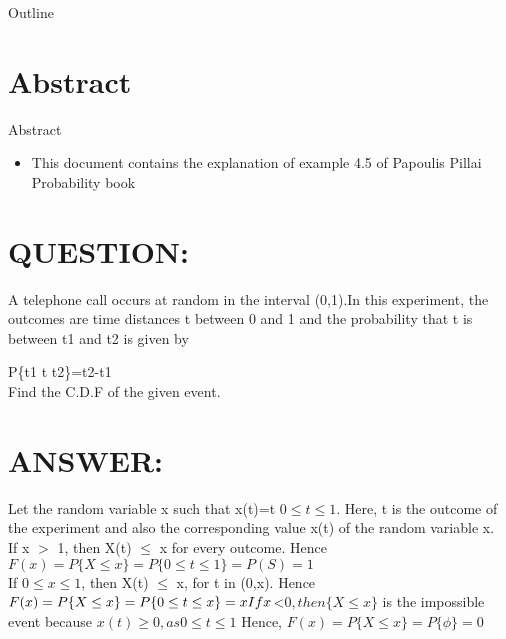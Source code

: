 \documentclass{beamer}
\title{\typedef{ASSIGNMENT 5}}
\author{MUSKAN JAISWAL -cs21btech11037}
\date{May 2022}
\begin{document}
\begin{frame}
		\titlepage
	\end{frame}

\begin{frame}{Outline}
  \tableofcontents
\end{frame}

\section{Abstract}
	\begin{frame}{Abstract}
		\begin{itemize}
			\item 	This document contains the explanation of example 4.5 of Papoulis Pillai Probability book
		\end{itemize}
	\end{frame}


\maketitle

\section{QUESTION:}
\begin{frame}{}
\begin{block}{}
A telephone call occurs at random in the interval (0,1).In this experiment, the outcomes are time distances t between 0 and 1 and the probability that t is between t1 and t2 is given by \bigskip

P\{t1 \le t \le t2\}=t2-t1 \\
Find the C.D.F of the given event.
\end{block}
\end{frame}
\section{ANSWER:}
\begin{frame}
Let the  random variable x such that x(t)=t  $ 0 \le t \le1.$
Here, t is the outcome of the experiment and also the corresponding value x(t) of the random variable x.\\
If x $>$ 1, then X(t) $\le$ x for every outcome. Hence
$F(x) = P\{X \le x\}=P\{0 \le t \le 1\}=P(S)=1$ \\

If $0 \le x \le 1$, then X(t) $\le$ x, for t in (0,x). Hence
$F(x)=P\{X \le x\}=P\{0 \le t \le x\}=x \\
If x $<$ 0, then \{X \le x\} $ is the impossible event because $ x(t) \ge 0 ,as 0 \le t \le 1$
Hence, $F(x)=P\{X \le x\}=P\{\phi\}=0 $ \\
\end{frame}
\end{document}
